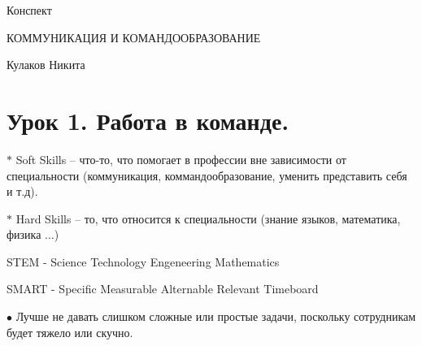 \documentclass[12pt,a4paper]{report}
\begin{document}
	
\begin{comment}
	https://www.opennet.ru/docs/RUS/latex/node2.html - секционирование
	https://www.linux.org.ru/forum/general/6926046 - многострочные комментарии
	https://www.opennet.ru/docs/RUS/latex/node2.html - верстка текста
	http://blog.harrix.org/article/661 - ссылки, гиперссылки
	http://mydebianblog.blogspot.com/2011/05/latex.html - оглавления (нумерация, переименование)	
	https://tex.stackexchange.com/questions/45948/what-is-the-difference-between-hspace-fill-and-hfill - горизонтальное заполнение.
	
	http://mif.vspu.ru/books/ASYfb.pdf - рисунки
	https://www.mccme.ru/free-books/llang/newllang.pdf - книжка
	http://www.ict.nsc.ru/jspui/bitstream/ICT/1488/1/pgf-ru-all-method.pdf - tikz
	https://engraver.wordpress.com/2011/08/27/tikz-%
\end{comment}

\thispagestyle{empty}
{\Large Конспект}

\vspace*{230pt}
\begin{center}
\medskip
{\LARGE КОММУНИКАЦИЯ И КОМАНДООБРАЗОВАНИЕ}
\end{center}

\vspace{300pt}
\begin{flushright}
	{\LARGE Кулаков Никита}
\end{flushright}
\vspace*{\fill}
		
\newpage
\setcounter{page}{1}
\section*{Урок 1. Работа в команде.}
$\ast$ Soft Skills -- что-то, что помогает в профессии вне зависимости от специальности
 (коммуникация, коммандообразование, уменить представить себя и т.д).

\medskip
$\ast$ Hard Skills -- то, что относится к специальности (знание языков, математика, физика $\dots$)

\medskip\medskip
STEM - Science Technology Engeneering Mathematics

\medskip
SMART - Specific Measurable Alternable Relevant Timeboard

\bigskip
$\bullet$ Лучше не давать слишком сложные или простые задачи, поскольку сотрудникам будет
тяжело или скучно.
\end{document}
